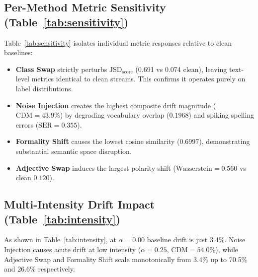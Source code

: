 \documentclass[conference]{IEEEtran}
\begin{document}
\subsection{Per-Method Metric Sensitivity (Table~\ref{tab:sensitivity})}
Table~\ref{tab:sensitivity} isolates individual metric responses relative to clean baselines:
\begin{itemize}
    \item \textbf{Class Swap} strictly perturbs $\text{JSD}_{\text{score}}$ (0.691 vs 0.074 clean), leaving text-level metrics identical to clean streams. This confirms it operates purely on label distributions.
    \item \textbf{Noise Injection} creates the highest composite drift magnitude ($\text{CDM} = 43.9\%$) by degrading vocabulary overlap ($0.1968$) and spiking spelling errors ($\text{SER} = 0.355$).
    \item \textbf{Formality Shift} causes the lowest cosine similarity ($0.6997$), demonstrating substantial semantic space disruption.
    \item \textbf{Adjective Swap} induces the largest polarity shift ($\text{Wasserstein} = 0.560$ vs clean $0.120$).
\end{itemize}

\begin{table}[htbp]
\caption{Composite Drift Magnitude (\%) Under Varying Intensities}
\label{tab:intensity}
\centering
\setlength{\tabcolsep}{3pt}
\end{table}

\subsection{Multi-Intensity Drift Impact (Table~\ref{tab:intensity})}
As shown in Table~\ref{tab:intensity}, at $\alpha=0.00$ baseline drift is just 3.4\%. Noise Injection causes acute drift at low intensity ($\alpha=0.25$, $\text{CDM} = 54.0\%$), while Adjective Swap and Formality Shift scale monotonically from 3.4\% up to 70.5\% and 26.6\% respectively.
\end{document}
